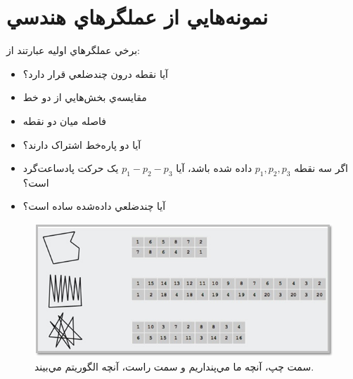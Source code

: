 \documentclass{book}
\begin{document}
      \section*{نمونه‌هايي از عملگرهاي هندسي} 	
      برخي عملگرهاي اوليه عبارتند از:
      \begin{itemize}
		\item 
آيا نقطه درون چندضلعي قرار دارد؟
		\item
مقايسه‌ي بخش‌هايي از دو خط
		\item
فاصله ميان دو نقطه
		\item
آيا دو پاره‌خط اشتراک دارند؟
		\item
اگر سه نقطه 
$p_{1},p_{2},p_{3}$
 داده شده باشد، آيا
$p_{1} - p_{2} - p_{3}$
 يک حرکت پادساعت‌گرد است؟
		\item
			آيا چندضلعي داده‌شده ساده است؟
      \end{itemize}
   \begin{figure}[h!]
	\begin{center}
		\includegraphics{2.jpg}
			\caption{سمت چپ، آنچه ما مي‌پنداريم و سمت راست، آنچه الگوريتم مي‌بيند.}
	\end{center}
   	\label{شکل 2}
\end{figure}  
\end{document}
